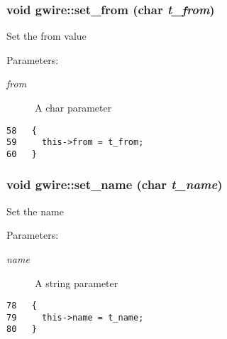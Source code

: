 \subsubsection{\setlength{\rightskip}{0pt plus 5cm}void gwire::set\_\-from (char {\em t\_\-from})\hspace{0.3cm}{\tt  [inline]}}\label{classgwire_ab5ce75b5865941097bccc79b2ddf169}


Set the from value

\begin{Desc}
\item[Parameters:]
\begin{description}
\item[{\em from}]A char parameter \end{description}
\end{Desc}


\begin{Code}\begin{verbatim}58   {
59     this->from = t_from;
60   }
\end{verbatim}\end{Code}


\subsubsection{\setlength{\rightskip}{0pt plus 5cm}void gwire::set\_\-name (char {\em t\_\-name})\hspace{0.3cm}{\tt  [inline]}}\label{classgwire_f5623801c87c4331b16088d816b9f101}


Set the name

\begin{Desc}
\item[Parameters:]
\begin{description}
\item[{\em name}]A string parameter \end{description}
\end{Desc}


\begin{Code}\begin{verbatim}78   {
79     this->name = t_name;
80   }
\end{verbatim}\end{Code}


